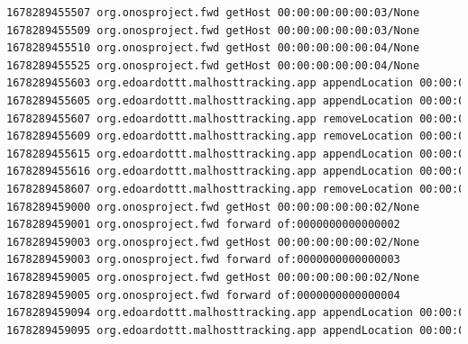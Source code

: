 \begin{lstlisting}[language=bash]
1678289455507 org.onosproject.fwd getHost 00:00:00:00:00:03/None
1678289455509 org.onosproject.fwd getHost 00:00:00:00:00:03/None
1678289455510 org.onosproject.fwd getHost 00:00:00:00:00:04/None
1678289455525 org.onosproject.fwd getHost 00:00:00:00:00:04/None
1678289455603 org.edoardottt.malhosttracking.app appendLocation 00:00:00:00:00:03/None of:0000000000000001/1
1678289455605 org.edoardottt.malhosttracking.app appendLocation 00:00:00:00:00:01/None of:0000000000000003/1
1678289455607 org.edoardottt.malhosttracking.app removeLocation 00:00:00:00:00:01/None of:0000000000000001/1
1678289455609 org.edoardottt.malhosttracking.app removeLocation 00:00:00:00:00:03/None of:0000000000000003/1
1678289455615 org.edoardottt.malhosttracking.app appendLocation 00:00:00:00:00:04/None of:0000000000000002/1
1678289455616 org.edoardottt.malhosttracking.app appendLocation 00:00:00:00:00:02/None of:0000000000000004/1
1678289458607 org.edoardottt.malhosttracking.app removeLocation 00:00:00:00:00:04/None of:0000000000000004/1
1678289459000 org.onosproject.fwd getHost 00:00:00:00:00:02/None
1678289459001 org.onosproject.fwd forward of:0000000000000002
1678289459003 org.onosproject.fwd getHost 00:00:00:00:00:02/None
1678289459003 org.onosproject.fwd forward of:0000000000000003
1678289459005 org.onosproject.fwd getHost 00:00:00:00:00:02/None
1678289459005 org.onosproject.fwd forward of:0000000000000004
1678289459094 org.edoardottt.malhosttracking.app appendLocation 00:00:00:00:00:03/None of:0000000000000003/1
1678289459095 org.edoardottt.malhosttracking.app appendLocation 00:00:00:00:00:01/None of:0000000000000001/1
\end{lstlisting}

